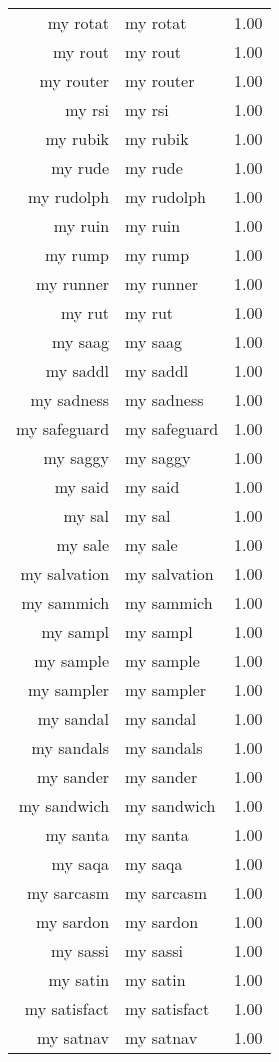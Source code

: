 \begin{table}[ht]
\begin{tabular}{rlr}
  my rotat & my rotat & 1.00 \\ 
  my rout & my rout & 1.00 \\ 
  my router & my router & 1.00 \\ 
  my rsi & my rsi & 1.00 \\ 
  my rubik & my rubik & 1.00 \\ 
  my rude & my rude & 1.00 \\ 
  my rudolph & my rudolph & 1.00 \\ 
  my ruin & my ruin & 1.00 \\ 
  my rump & my rump & 1.00 \\ 
  my runner & my runner & 1.00 \\ 
  my rut & my rut & 1.00 \\ 
  my saag & my saag & 1.00 \\ 
  my saddl & my saddl & 1.00 \\ 
  my sadness & my sadness & 1.00 \\ 
  my safeguard & my safeguard & 1.00 \\ 
  my saggy & my saggy & 1.00 \\ 
  my said & my said & 1.00 \\ 
  my sal & my sal & 1.00 \\ 
  my sale & my sale & 1.00 \\ 
  my salvation & my salvation & 1.00 \\ 
  my sammich & my sammich & 1.00 \\ 
  my sampl & my sampl & 1.00 \\ 
  my sample & my sample & 1.00 \\ 
  my sampler & my sampler & 1.00 \\ 
  my sandal & my sandal & 1.00 \\ 
  my sandals & my sandals & 1.00 \\ 
  my sander & my sander & 1.00 \\ 
  my sandwich & my sandwich & 1.00 \\ 
  my santa & my santa & 1.00 \\ 
  my saqa & my saqa & 1.00 \\ 
  my sarcasm & my sarcasm & 1.00 \\ 
  my sardon & my sardon & 1.00 \\ 
  my sassi & my sassi & 1.00 \\ 
  my satin & my satin & 1.00 \\ 
  my satisfact & my satisfact & 1.00 \\ 
  my satnav & my satnav & 1.00 \\ 

\end{tabular}
\end{table}
